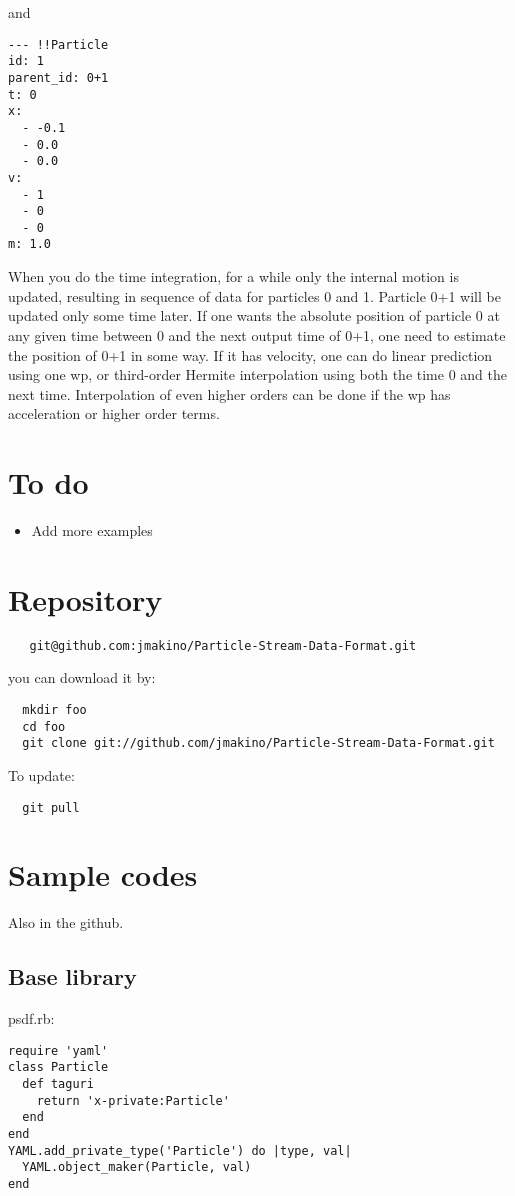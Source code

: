 \documentclass[12pt]{article}
\begin{document}
and

\begin{verbatim}
--- !!Particle
id: 1
parent_id: 0+1
t: 0
x:
  - -0.1
  - 0.0
  - 0.0
v:
  - 1
  - 0
  - 0
m: 1.0
\end{verbatim}

When you do the time integration, for a while only the internal motion
is updated, resulting in sequence of data for particles 0 and
1. Particle 0+1 will be updated only some time later. 
If one wants the absolute position of particle 0 at any
given time between 0 and the next output time of 0+1, one need to
estimate the position of 0+1 in some way. If it has velocity, one can
do linear prediction using one wp, or third-order Hermite
interpolation using both the time 0 and the next time. Interpolation
of even higher orders can be done if the wp has acceleration or higher
order terms.

\section{To do}

\begin{itemize}
\item Add more examples
\end{itemize}  


\appendix

\section{Repository}


\begin{verbatim}
   git@github.com:jmakino/Particle-Stream-Data-Format.git
\end{verbatim}

you can download it by:
\begin{verbatim}
  mkdir foo
  cd foo
  git clone git://github.com/jmakino/Particle-Stream-Data-Format.git
\end{verbatim}

To update:

\begin{verbatim}
  git pull
\end{verbatim}
  
\section{Sample codes}
Also in the github.

\subsection{Base library}
psdf.rb:
\begin{verbatim}
require 'yaml'
class Particle
  def taguri
    return 'x-private:Particle'
  end
end
YAML.add_private_type('Particle') do |type, val|
  YAML.object_maker(Particle, val)
end
\end{verbatim}
\end{document}

